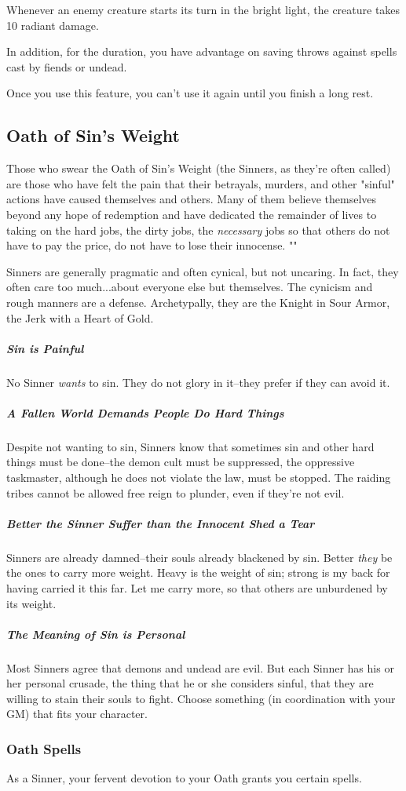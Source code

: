 Whenever an enemy creature starts its turn in the bright light, the creature takes 10 radiant damage.

In addition, for the duration, you have advantage on saving throws against spells cast by fiends or undead.

Once you use this feature, you can't use it again until you finish a long rest.

\subsection{Oath of Sin's Weight}
Those who swear the Oath of Sin's Weight (the Sinners, as they're often called) are those who have felt the pain that their betrayals, murders, and other "sinful" actions have caused themselves and others. Many of them believe themselves beyond any hope of redemption and have dedicated the remainder of lives to taking on the hard jobs, the dirty jobs, the \textit{necessary} jobs so that others do not have to pay the price, do not have to lose their innocense. ""

Sinners are generally pragmatic and often cynical, but not uncaring. In fact, they often care too much...about everyone else but themselves. The cynicism and rough manners are a defense. Archetypally, they are the Knight in Sour Armor, the Jerk with a Heart of Gold.

\subparagraph{Sin is Painful} No Sinner \textit{wants} to sin. They do not glory in it--they prefer if they can avoid it.
\subparagraph{A Fallen World Demands People Do Hard Things} Despite not wanting to sin, Sinners know that sometimes sin and other hard things must be done--the demon cult must be suppressed, the oppressive taskmaster, although he does not violate the law, must be stopped. The raiding tribes cannot be allowed free reign to plunder, even if they're not evil.
\subparagraph{Better the Sinner Suffer than the Innocent Shed a Tear} Sinners are already damned--their souls already blackened by sin. Better \textit{they} be the ones to carry more weight. Heavy is the weight of sin; strong is my back for having carried it this far. Let me carry more, so that others are unburdened by its weight.
\subparagraph{The Meaning of Sin is Personal} Most Sinners agree that demons and undead are evil. But each Sinner has his or her personal crusade, the thing that he or she considers sinful, that they are willing to stain their souls to fight. Choose something (in coordination with your GM) that fits your character.

\subsubsection{Oath Spells}
As a Sinner, your fervent devotion to your Oath grants you certain spells.

